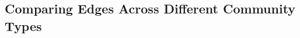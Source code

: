 \documentclass[10pt,letterpaper]{article}
\begin{document}




\subsection{Comparing Edges Across Different Community Types}
\end{document}

